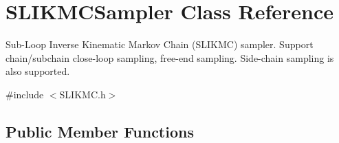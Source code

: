 \hypertarget{classSLIKMCSampler}{\section{S\-L\-I\-K\-M\-C\-Sampler Class Reference}
\label{classSLIKMCSampler}
}


Sub-\/\-Loop Inverse Kinematic Markov Chain (S\-L\-I\-K\-M\-C) sampler. Support chain/subchain close-\/loop sampling, free-\/end sampling. Side-\/chain sampling is also supported.  




{\ttfamily \#include $<$S\-L\-I\-K\-M\-C.\-h$>$}

\subsection*{Public Member Functions}
